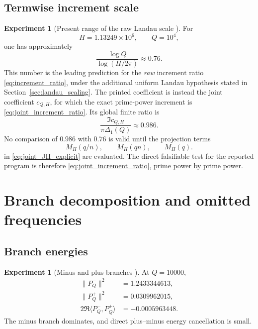 \documentclass[11pt]{amsart}
\numberwithin{equation}{section}
\theoremstyle{plain}
\theoremstyle{definition}
\newtheorem{experiment}[theorem]{Experiment}
\theoremstyle{remark}
\newcommand{\1}{\mathbf{1}}
\begin{document}
\subsection{Termwise increment scale}
\label{subsec:numerical_increment_scale}

\begin{experiment}[Present range of the raw Landau scale {\normalfont[Numerical]}]
\label{exp:numerical_landau_ratio}
For
\begin{equation}
H=1.13249\times10^6,
\qquad Q=10^4,
\label{eq:numerical_H_Q_pair}
\end{equation}
one has approximately
\begin{equation}
\frac{\log Q}{\log(H/2\pi)}\approx0.76.
\label{eq:numerical_log_ratio}
\end{equation}
This number is the leading prediction for the \emph{raw} increment ratio
\eqref{eq:increment_ratio}, under the additional uniform Landau
hypothesis stated in Section~\ref{sec:landau_scaling}.  The printed
coefficient is instead the joint coefficient \(c_{Q,H}\), for which the
exact prime-power increment is \eqref{eq:joint_increment_ratio}.  Its
global finite ratio is
\begin{equation}
\frac{\Im c_{Q,H}}{\pi\Delta_1(Q)}\approx0.986.
\label{eq:numerical_global_ratio_again}
\end{equation}
No comparison of \(0.986\) with \(0.76\) is valid until the projection
terms
\begin{equation}
M_H(q/n),\qquad M_H(qn),\qquad M_H(q).
\label{eq:numerical_projection_kernel_terms}
\end{equation}
in \eqref{eq:joint_JH_explicit} are evaluated.  The direct falsifiable
test for the reported program is therefore
\eqref{eq:joint_increment_ratio}, prime power by prime power.
\end{experiment}

\section{Branch decomposition and omitted frequencies}
\label{sec:numerical_branches_omitted}

\subsection{Branch energies}
\label{subsec:numerical_branch_energies}

\begin{experiment}[Minus and plus branches {\normalfont[Numerical]}]
\label{exp:numerical_branch_energy_detailed}
At $Q=10000$,
\begin{align}
\|P_Q^-\|^2
&=1.2433344613,
\label{eq:numerical_minus_energy_detailed}
\\
\|P_Q^+\|^2
&=0.0309962015,
\label{eq:numerical_plus_energy_detailed}
\\
2\Re\langle P_Q^-,P_Q^+\rangle
&=-0.0005963448.
\label{eq:numerical_cross_energy_detailed}
\end{align}
The minus branch dominates, and direct plus--minus energy cancellation is
small.
\end{experiment}
\end{document}

